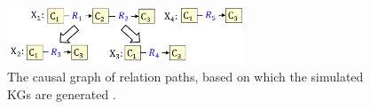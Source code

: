 \begin{figure}[h]
\centering
\includegraphics[width=7cm]{submissions/causal-meta-knowledge/figures/simulationv4.pdf}
\caption{The causal graph of relation paths, based on which the simulated KGs are generated .}
\label{fig:simulation}
\end{figure}

\begin{table}[h]
\caption{The parameters of conditional distributions.}
\label{tab:simulation_set}
\centering
{}
\end{table}

